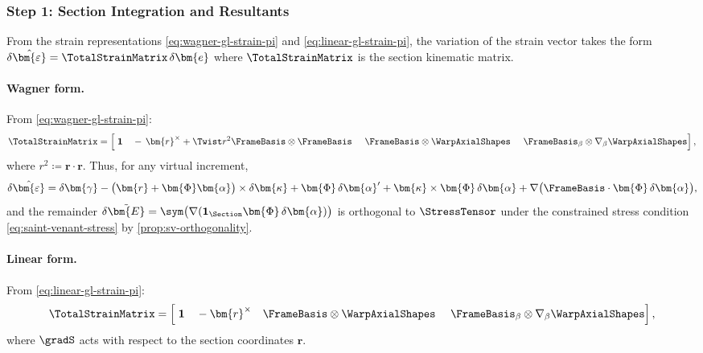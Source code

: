 \subsubsection{Step 1: Section Integration and Resultants}\label{sec:resultants}

From the strain representations \eqref{eq:wagner-gl-strain-pi} and \eqref{eq:linear-gl-strain-pi}, the variation of the strain vector takes the form
\(
\delta\hat{\bm{\varepsilon}}=\TotalStrainMatrix\,\delta\bm{e}
\)
where \(\TotalStrainMatrix\) is the section kinematic matrix.

\paragraph{Wagner form.}
From \eqref{eq:wagner-gl-strain-pi}:
\begin{equation}
\TotalStrainMatrix
=\left[
\;\mathbf{1}
~~~-\,\bm{r}^{\times}+\Twist r^2 \FrameBasis\otimes\FrameBasis
~~~~\FrameBasis\otimes\WarpAxialShapes
~~~~\FrameBasis_{\beta}\otimes\nabla_{\beta}\WarpAxialShapes
\right],
\label{eq:def-section-kinematic-matrix-wagner}
\end{equation}
where \(r^2 \coloneq \bm{r}\cdot\bm{r}\).
Thus, for any virtual increment,
\begin{equation}
\delta\hat{\bm{\varepsilon}}
=\delta\bm{\gamma}
-\big(\bm{r}
+\bm{\Phi}\bm{\alpha}\big)\times\delta\bm{\kappa}
+\bm{\Phi}\,\delta\bm{\alpha}'
+\bm{\kappa}\times\bm{\Phi}\,\delta\bm{\alpha}
+\nabla\big(\FrameBasis\cdot\bm{\Phi}\,\delta\bm{\alpha}\big),
\label{eq:delta-strain-vector-wagner}
\end{equation}
and the remainder
\(
\delta\tilde{\bm{E}}=\sym\big(\nabla(\mathbf{1}_{\Section}\bm{\Phi}\,\delta\bm{\alpha})\big)
\)
is orthogonal to \(\StressTensor\) under the constrained stress condition \eqref{eq:saint-venant-stress} by \cref{prop:sv-orthogonality}.

\paragraph{Linear form.}
From \eqref{eq:linear-gl-strain-pi}:
\begin{equation}
\TotalStrainMatrix
=\left[
\;\mathbf{1}
~~~-\bm{r}^{\times}
~~~\FrameBasis\otimes\WarpAxialShapes
~~~~\FrameBasis_{\beta}\otimes\nabla_{\beta}\WarpAxialShapes
\right],
\label{eq:def-section-kinematic-matrix-Phi}
\end{equation}
where \(\gradS\) acts with respect to the section coordinates \(\bm{r}\).

